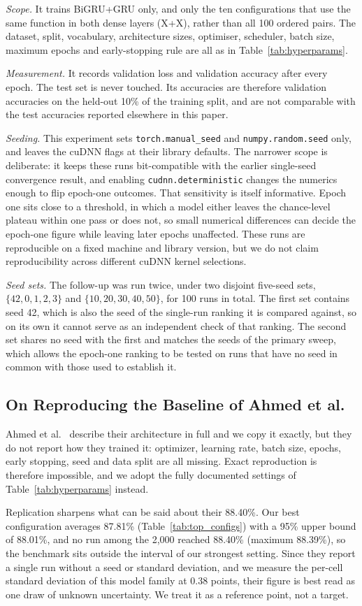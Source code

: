 \textit{Scope.} It trains BiGRU+GRU only, and only the ten
configurations that use the same function in both dense layers
(X+X), rather than all 100 ordered pairs. The dataset, split,
vocabulary, architecture sizes, optimiser, scheduler, batch size,
maximum epochs and early-stopping rule are all as in
Table~\ref{tab:hyperparams}.

\textit{Measurement.} It records validation loss and validation
accuracy after every epoch. The test set is never touched. Its
accuracies are therefore validation accuracies on the held-out
10\% of the training split, and are not comparable with the test
accuracies reported elsewhere in this paper.

\textit{Seeding.} This experiment sets \texttt{torch.manual\_seed}
and \texttt{numpy.random.seed} only, and leaves the cuDNN flags at
their library defaults. The narrower scope is deliberate: it keeps
these runs bit-compatible with the earlier single-seed convergence
result, and enabling \texttt{cudnn.deterministic} changes the
numerics enough to flip epoch-one outcomes. That sensitivity is
itself informative. Epoch one sits close to a threshold, in which
a model either leaves the chance-level plateau within one pass or
does not, so small numerical differences can decide the epoch-one
figure while leaving later epochs unaffected. These runs are
reproducible on a fixed machine and library version, but we do not
claim reproducibility across different cuDNN kernel selections.

\textit{Seed sets.} The follow-up was run twice, under two
disjoint five-seed sets, $\{42,0,1,2,3\}$ and
$\{10,20,30,40,50\}$, for 100 runs in total. The first set
contains seed 42, which is also the seed of the single-run
ranking it is compared against, so on its own it cannot serve as
an independent check of that ranking. The second set shares no
seed with the first and matches the seeds of the primary sweep,
which allows the epoch-one ranking to be tested on runs that have
no seed in common with those used to establish it.

\subsection{On Reproducing the Baseline of Ahmed et al.}
\label{sec:baseline_repro}

Ahmed et al.~\cite{ahmed2025} describe their architecture in full
and we copy it exactly, but they do not report how they trained
it: optimizer, learning rate, batch size, epochs, early stopping,
seed and data split are all missing. Exact reproduction is
therefore impossible, and we adopt the fully documented settings of
Table~\ref{tab:hyperparams} instead.

Replication sharpens what can be said about their 88.40\%. Our best
configuration averages 87.81\% (Table~\ref{tab:top_configs})
with a 95\% upper bound of 88.01\%,
and no run among the 2{,}000 reached 88.40\% (maximum 88.39\%), so
the benchmark sits outside the interval of our strongest setting.
Since they report a single run without a seed or standard
deviation, and we measure the per-cell standard deviation of this
model family at 0.38 points, their figure is best read as one draw
of unknown uncertainty. We treat it as a reference point, not a
target.
